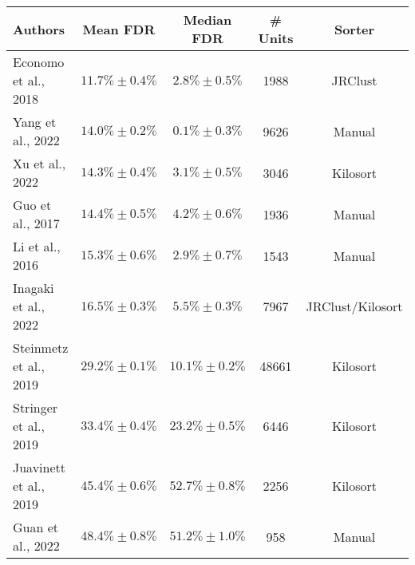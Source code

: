 \documentclass{article}
\begin{document}
	\begin{spacing}{1.9}
		\begin{table}[ht]
			\begin{tabular}{lcccc}
				\hline
				Authors & Mean FDR & Median FDR & \# Units & Sorter \\ 
				\hline 
				Economo et al., 2018 & $11.7\% \pm 0.4\%$ & $2.8\% \pm 0.5\%$ & 1988 & JRClust \\
				Yang et al., 2022 & $14.0\% \pm 0.2\%$ & $0.1\% \pm 0.3\%$ & 9626 & Manual\\
				Xu et al., 2022 & $14.3\% \pm 0.4\%$ & $3.1\% \pm 0.5\%$ & 3046 & Kilosort\\  
				Guo et al., 2017 & $14.4\% \pm 0.5\%$ & $4.2\% \pm 0.6\%$ & 1936 & Manual\\
				Li et al., 2016 & $15.3\% \pm 0.6\%$ & $2.9\% \pm 0.7\%$ & 1543 & Manual\\ 
				Inagaki et al., 2022 & $16.5\% \pm 0.3\%$ & $5.5\% \pm 0.3\%$ & 7967 & JRClust/Kilosort \\ 
				Steinmetz et al., 2019 & $29.2\% \pm 0.1\%$ & $10.1\% \pm 0.2\%$ & 48661 & Kilosort \\ 
				Stringer et al., 2019 & $33.4\% \pm 0.4\%$ & $23.2\% \pm 0.5\%$ & 6446 & Kilosort \\ 
				Juavinett et al., 2019 & $45.4\% \pm 0.6\%$ & $52.7\% \pm 0.8\%$ & 2256 & Kilosort \\ 
				Guan et al., 2022 & $48.4\% \pm 0.8\%$ & $51.2\% \pm 1.0\%$ & 958 & Manual \\ 
				\hline
			\end{tabular}
		\end{table}
	\end{spacing}
\end{document}
